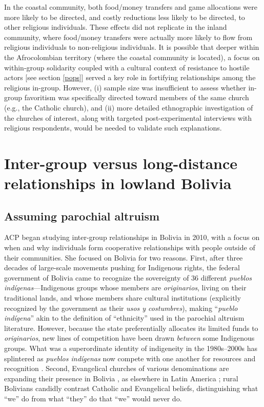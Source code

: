 \documentclass[bibauthoryear]{aa}
\begin{document}
In the coastal community, both food/money transfers and game allocations were more likely to be directed, and costly reductions less likely to be directed, to other religious individuals. These effects did not replicate in the inland community, where food/money transfers were actually more likely to flow from religious individuals to non-religious individuals. It is possible that deeper within the Afrocolombian territory (where the coastal community is located), a focus on within-group solidarity coupled with a cultural context of resistance to hostile actors [see section \ref{pops}] \citep{oyola2017local} served a key role in fortifying relationships among the religious in-group. However, (i) sample size was insufficient to assess whether in-group favoritism was specifically directed toward members of the same church (e.g., the Catholic church), and (ii) more detailed ethnographic investigation of the churches of interest, along with targeted post-experimental interviews with religious respondents, would be needed to validate such explanations.


\section{Inter-group versus long-distance relationships in lowland Bolivia}
\subsection{Assuming parochial altruism}
ACP began studying inter-group relationships in Bolivia in 2010, with a focus on when and why   individuals form cooperative relationships with people outside of their communities.   She focused on Bolivia for two reasons. First, after three decades of large-scale movements pushing for Indigenous rights, the federal government of Bolivia came to recognize the sovereignty of 36 different  \textit{pueblos ind\'igenas}---Indigenous groups whose members are \textit{originarios}, living on their traditional lands, and whose members share cultural institutions (explicitly recognized by the government as their  \textit{usos y costumbres}), making ``\textit{pueblo ind\'igena}'' akin to the definition of ``ethnicity'' used in the parochial altruism literature. However, because the state preferentially allocates its limited funds to \textit{originarios}, new lines of competition have been drawn \textit{between} some Indigenous groups. What was a superordinate identity of indigeneity in the 1980s--2000s has splintered as \textit{pueblos ind\'igenas} now compete with one another for resources and recognition \citep{fontana2014indigenous}.
Second, Evangelical churches of various denominations are expanding their presence in Bolivia \citep{lesley1993religious}, as elsewhere in Latin America \citep{stoll1990latin}; rural Bolivians candidly contrast Catholic and Evangelical beliefs, distinguishing what ``we'' do from what ``they'' do that ``we'' would never do. 
\end{document}
